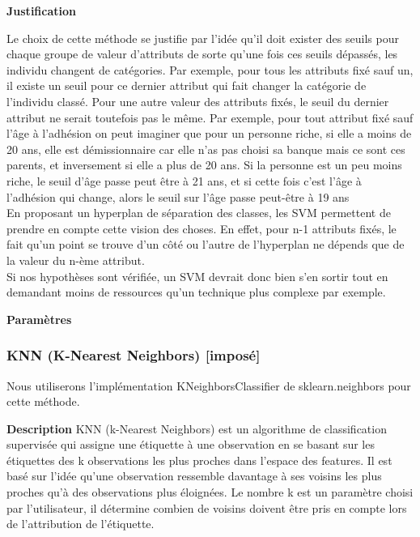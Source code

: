 \documentclass{ceri/sty/rapport}
\begin{document}
\textbf{Justification}

Le choix de cette méthode se justifie par l'idée qu'il doit exister des seuils pour chaque groupe de valeur d'attributs de sorte qu'une fois ces seuils dépassés, les individu changent de catégories. Par exemple, pour tous les attributs fixé sauf un, il existe un seuil pour ce dernier attribut qui fait changer la catégorie de l'individu classé. Pour une autre valeur des attributs fixés, le seuil du dernier attribut ne serait toutefois pas le même. Par exemple, pour tout attribut fixé sauf l'âge à l'adhésion on peut imaginer que pour un personne riche, si elle a moins de 20 ans, elle est démissionnaire car elle n'as pas choisi sa banque mais ce sont ces parents, et inversement si elle a plus de 20 ans. Si la personne est un peu moins riche, le seuil d'âge passe peut être à 21 ans, et si cette fois c'est l'âge à l'adhésion qui change, alors le seuil sur l'âge passe peut-être à 19 ans \\
En proposant un hyperplan de séparation des classes, les SVM permettent de prendre en compte cette vision des choses. En effet, pour n-1 attributs fixés, le fait qu'un point se trouve d'un côté ou l'autre de l'hyperplan ne dépends que de la valeur du n-ème attribut.\\
Si nos hypothèses sont vérifiée, un SVM devrait donc bien s'en sortir tout en demandant moins de ressources qu'un technique plus complexe par exemple.


\textbf{Paramètres}



\subsubsection{KNN (K-Nearest Neighbors) [imposé]}

Nous utiliserons l'implémentation KNeighborsClassifier de sklearn.neighbors pour cette méthode.

\textbf{Description}
KNN (k-Nearest Neighbors) est un algorithme de classification supervisée qui assigne une étiquette à une observation en se basant sur les étiquettes des k observations les plus proches dans l'espace des features. Il est basé sur l'idée qu'une observation ressemble davantage à ses voisins les plus proches qu'à des observations plus éloignées. Le nombre k est un paramètre choisi par l'utilisateur, il détermine combien de voisins doivent être pris en compte lors de l'attribution de l'étiquette.
\end{document}

